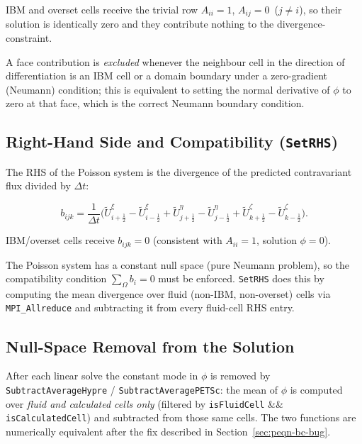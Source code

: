 \documentclass[12pt,a4paper]{article}
\begin{document}
IBM and overset cells receive the trivial row $A_{ii}=1$,
$A_{ij}=0$~($j\neq i$), so their solution is identically zero and they
contribute nothing to the divergence-constraint.

A face contribution is \emph{excluded} whenever the neighbour cell in
the direction of differentiation is an IBM cell or a domain boundary
under a zero-gradient (Neumann) condition; this is equivalent to setting
the normal derivative of $\phi$ to zero at that face, which is the
correct Neumann boundary condition.

\subsection{Right-Hand Side and Compatibility (\texttt{SetRHS})}
\label{sec:peqn-rhs}

The RHS of the Poisson system is the divergence of the predicted
contravariant flux divided by $\Delta t$:

\begin{equation}
  b_{ijk}
  = \frac{1}{\Delta t}
    \bigl(
      \widetilde{U}^{\xi}_{i+\tfrac12} - \widetilde{U}^{\xi}_{i-\tfrac12}
    + \widetilde{U}^{\eta}_{j+\tfrac12} - \widetilde{U}^{\eta}_{j-\tfrac12}
    + \widetilde{U}^{\zeta}_{k+\tfrac12} - \widetilde{U}^{\zeta}_{k-\tfrac12}
    \bigr).
\end{equation}

IBM/overset cells receive $b_{ijk}=0$ (consistent with $A_{ii}=1$,
solution $\phi=0$).

The Poisson system has a constant null space (pure Neumann problem),
so the compatibility condition $\sum_\Omega b_i = 0$ must be enforced.
\texttt{SetRHS} does this by computing the mean divergence over fluid
(non-IBM, non-overset) cells via \texttt{MPI\_Allreduce} and
subtracting it from every fluid-cell RHS entry.

\subsection{Null-Space Removal from the Solution}
\label{sec:peqn-nullspace}

After each linear solve the constant mode in $\phi$ is removed by
\texttt{SubtractAverageHypre} / \texttt{SubtractAveragePETSc}: the
mean of $\phi$ is computed over \emph{fluid and calculated cells only}
(filtered by \texttt{isFluidCell} \&\& \texttt{isCalculatedCell}) and
subtracted from those same cells.  The two functions are numerically
equivalent after the fix described in Section~\ref{sec:peqn-bc-bug}.
\end{document}
